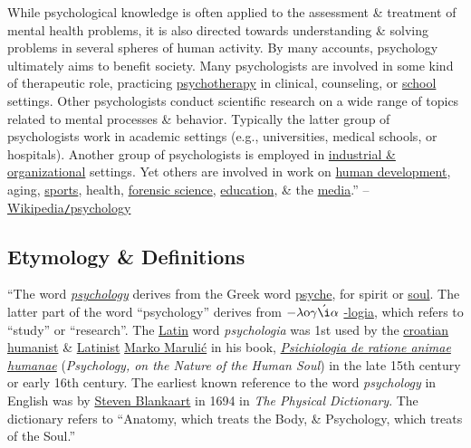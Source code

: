 \documentclass[oneside]{book}
\numberwithin{equation}{section}
\begin{document}
While psychological knowledge is often applied to the assessment \& treatment of mental health problems, it is also directed towards understanding \& solving problems in several spheres of human activity. By many accounts, psychology ultimately aims to benefit society. Many psychologists are involved in some kind of therapeutic role, practicing \href{https://en.wikipedia.org/wiki/Psychotherapy}{psychotherapy} in clinical, counseling, or \href{https://en.wikipedia.org/wiki/School_psychology}{school} settings. Other psychologists conduct scientific research on a wide range of topics related to mental processes \& behavior. Typically the latter group of psychologists work in academic settings (e.g., universities, medical schools, or hospitals). Another group of psychologists is employed in \href{https://en.wikipedia.org/wiki/Industrial_and_organizational_psychology}{industrial \& organizational} settings. Yet others are involved in work on \href{https://en.wikipedia.org/wiki/Developmental_psychology}{human development}, aging, \href{https://en.wikipedia.org/wiki/Sports_psychology}{sports}, health, \href{https://en.wikipedia.org/wiki/Forensic_psychology}{forensic science}, \href{https://en.wikipedia.org/wiki/Educational_psychology}{education}, \& the \href{https://en.wikipedia.org/wiki/Media_psychology}{media}.'' -- \href{https://en.wikipedia.org/wiki/Psychology}{Wikipedia\texttt{/}psychology}

\subsection{Etymology \& Definitions}
``The word \href{https://en.wiktionary.org/wiki/psychology}{\textit{psychology}} derives from the Greek word \href{https://en.wikipedia.org/wiki/Psyche_(psychology)}{psyche}, for spirit or \href{https://en.wikipedia.org/wiki/Soul_(spirit)}{soul}. The latter part of the word ``psychology'' derives from $-\lambda{\rm o}\gamma\acute{\i}\alpha$ \href{https://en.wiktionary.org/wiki/-logia}{-logia}, which refers to ``study'' or ``research''. The \href{https://en.wikipedia.org/wiki/Latin}{Latin} word \textit{psychologia} was 1st used by the \href{https://en.wikipedia.org/wiki/Croatia}{croatian} \href{https://en.wikipedia.org/wiki/Humanism}{humanist} \& \href{https://en.wikipedia.org/wiki/Croatian_latinistic_literature}{Latinist} \href{https://en.wikipedia.org/wiki/Marko_Maruli%C4%87}{Marko Maruli\'c} in his book, \href{https://en.wikipedia.org/wiki/Psichiologia_de_ratione_animae_humanae}{\textit{Psichiologia de ratione animae humanae}} (\textit{Psychology, on the Nature of the Human Soul}) in the late 15th century or early 16th century. The earliest known reference to the word \textit{psychology} in English was by \href{https://en.wikipedia.org/wiki/Steven_Blankaart}{Steven Blankaart} in 1694 in \textit{The Physical Dictionary}. The dictionary refers to ``Anatomy, which treats the Body, \& Psychology, which treats of the Soul.''
\end{document}

